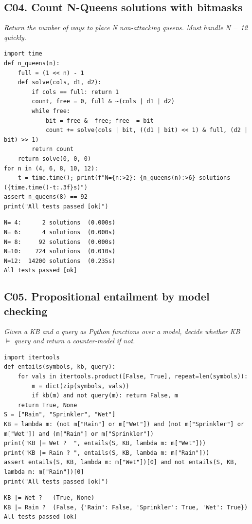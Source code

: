 \documentclass[11pt]{article}
\begin{document}
\subsection*{C04. Count N-Queens solutions with bitmasks \hfill{}}
\textit{Return the number of ways to place N non-attacking queens. Must handle N = 12 quickly.}
\begin{lstlisting}[style=py]
import time
def n_queens(n):
    full = (1 << n) - 1
    def solve(cols, d1, d2):
        if cols == full: return 1
        count, free = 0, full & ~(cols | d1 | d2)
        while free:
            bit = free & -free; free -= bit
            count += solve(cols | bit, ((d1 | bit) << 1) & full, (d2 | bit) >> 1)
        return count
    return solve(0, 0, 0)
for n in (4, 6, 8, 10, 12):
    t = time.time(); print(f"N={n:>2}: {n_queens(n):>6} solutions  ({time.time()-t:.3f}s)")
assert n_queens(8) == 92
print("All tests passed [ok]")
\end{lstlisting}
\begin{lstlisting}[style=out]
N= 4:      2 solutions  (0.000s)
N= 6:      4 solutions  (0.000s)
N= 8:     92 solutions  (0.000s)
N=10:    724 solutions  (0.010s)
N=12:  14200 solutions  (0.235s)
All tests passed [ok]
\end{lstlisting}
\subsection*{C05. Propositional entailment by model checking \hfill{}}
\textit{Given a KB and a query as Python functions over a model, decide whether KB $\models$ query and return a counter-model if not.}
\begin{lstlisting}[style=py]
import itertools
def entails(symbols, kb, query):
    for vals in itertools.product([False, True], repeat=len(symbols)):
        m = dict(zip(symbols, vals))
        if kb(m) and not query(m): return False, m
    return True, None
S = ["Rain", "Sprinkler", "Wet"]
KB = lambda m: (not m["Rain"] or m["Wet"]) and (not m["Sprinkler"] or m["Wet"]) and (m["Rain"] or m["Sprinkler"])
print("KB |= Wet ?  ", entails(S, KB, lambda m: m["Wet"]))
print("KB |= Rain ? ", entails(S, KB, lambda m: m["Rain"]))
assert entails(S, KB, lambda m: m["Wet"])[0] and not entails(S, KB, lambda m: m["Rain"])[0]
print("All tests passed [ok]")
\end{lstlisting}
\begin{lstlisting}[style=out]
KB |= Wet ?   (True, None)
KB |= Rain ?  (False, {'Rain': False, 'Sprinkler': True, 'Wet': True})
All tests passed [ok]
\end{lstlisting}
\end{document}
